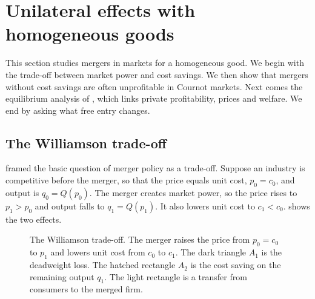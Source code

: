 \section{Unilateral effects with homogeneous goods}\label{sec:11-cournot}

This section studies mergers in markets for a homogeneous good. We begin with the trade-off between market power
and cost savings. We then show that mergers without cost savings are often unprofitable in Cournot markets. Next
comes the equilibrium analysis of \citet{FarrellShapiro1990}, which links private profitability, prices and
welfare. We end by asking what free entry changes.

\subsection{The Williamson trade-off}\label{sec:11-williamson}

\citet{Williamson1968} framed the basic question of merger policy as a trade-off. Suppose an industry is
competitive before the merger, so that the price equals unit cost, $p_0 = c_0$, and output is $q_0 = Q(p_0)$.
The merger creates market power, so the price rises to $p_1 > p_0$ and output falls to $q_1 = Q(p_1)$. It also
lowers unit cost to $c_1 < c_0$.  shows the two effects.

\begin{figure}[htbp]
\centering
{}
\caption{The Williamson trade-off. The merger raises the price from $p_0 = c_0$ to $p_1$ and lowers unit cost
from $c_0$ to $c_1$. The dark triangle $A_1$ is the deadweight loss. The hatched rectangle $A_2$ is the cost
saving on the remaining output $q_1$. The light rectangle is a transfer from consumers to the merged firm.}
\label{fig:11-williamson}
\end{figure}

